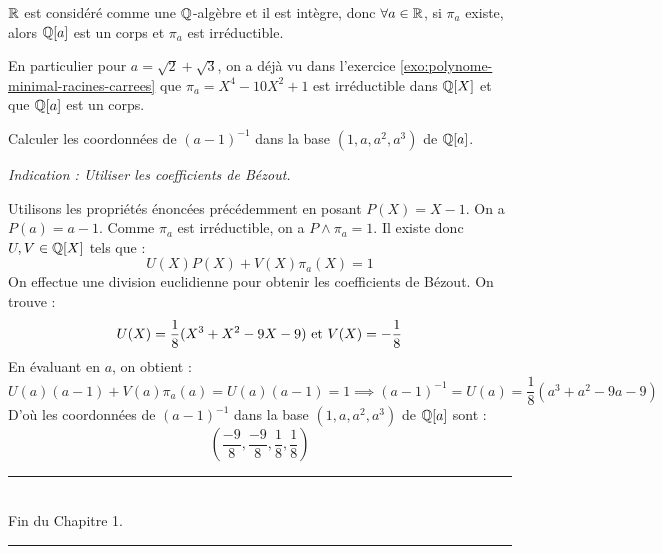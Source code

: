 \documentclass[11pt,a4paper]{report}
\begin{document}
\begin{exercise}
    $\mathbb{R}$ est considéré comme une $\mathbb{Q}$-algèbre et il est intègre, donc $\forall a \in \mathbb{R}$, si $\pi_a$ existe, alors $\mathbb{Q}[a]$ est un corps et $\pi_a$ est irréductible.

    En particulier pour $a = \sqrt 2 + \sqrt 3$, on a déjà vu dans l'exercice \ref{exo:polynome-minimal-racines-carrees} que $\pi_a = X^4 - 10X^2 + 1$ est irréductible dans $\mathbb{Q}[X]$ et que $\mathbb{Q}[a]$ est un corps.

    Calculer les coordonnées de $(a-1)^{-1}$ dans la base $(1, a, a^2, a^3)$ de $\mathbb{Q}[a]$.

    \textit{Indication : Utiliser les coefficients de Bézout.}
\end{exercise}

\begin{correction}
    Utilisons les propriétés énoncées précédemment en posant $P(X) = X - 1$. On a $P(a) = a - 1$. Comme $\pi_a$ est irréductible, on a $P \wedge \pi_a = 1$. Il existe donc $U, V \in \mathbb{Q}[X]$ tels que :
    \[
        U(X)P(X) + V(X)\pi_a(X) = 1
    \]
    On effectue une division euclidienne pour obtenir les coefficients de Bézout. On trouve :
    \[
        U(X) = \frac18(X^3 + X^2 - 9X - 9) \text{ et } V(X) = -\frac18
    \]
    En évaluant en $a$, on obtient :
    \[
        U(a)(a-1) + V(a)\pi_a(a) = U(a)(a-1) = 1 \implies (a-1)^{-1} = U(a) = \frac18(a^3 + a^2 - 9a - 9)
    \]
    D'où les coordonnées de $(a-1)^{-1}$ dans la base $(1, a, a^2, a^3)$ de $\mathbb{Q}[a]$ sont :
    \[
        \left(\frac{-9}{8}, \frac{-9}{8}, \frac{1}{8}, \frac{1}{8}\right)
    \]
\end{correction}

\begin{center}
    \rule{0.5\textwidth}{1pt}\\
    Fin du Chapitre 1.\\
    \rule{0.5\textwidth}{1pt}
\end{center}
\end{document}
